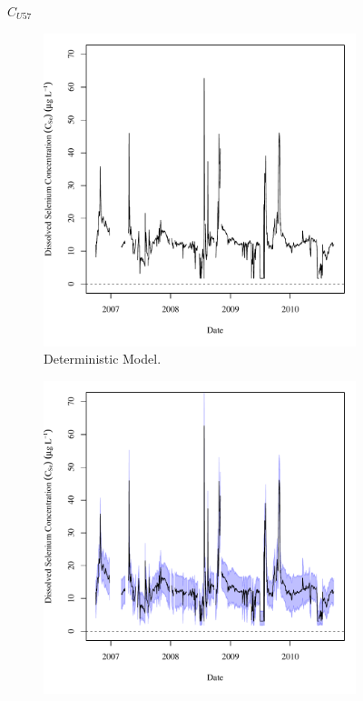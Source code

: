 \begin{linenumbers}
\subfiguremid
\begin{landscape}
	\begin{figure}
		$ C_{U57} $
		\begin{subfigure}{0.7\textwidth}
			\centering
			\includegraphics[width=\tableCustomSize]{"Figures/Results_DSR/Deterministic/c TS WIL"}
			\caption{Deterministic Model.}
		\end{subfigure}%
		\begin{subfigure}{0.7\textwidth}
			\centering
			\includegraphics[width=\tableCustomSize]{"Figures/Results_DSR/Stochastic/c TS WIL"}

\end{subfigure}
\end{figure}
\end{landscape}
\end{linenumbers}
